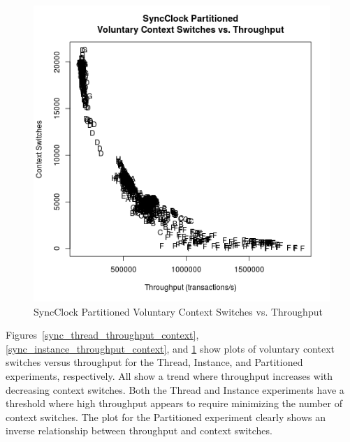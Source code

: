 \begin{figure}[H]
\center
\includegraphics[height=.4\textheight]{sync_partitioned_throughput_context.png}
\caption{SyncClock Partitioned Voluntary Context Switches vs. Throughput}
\label{sync_partitioned_throughput_context}
\end{figure}

Figures~\ref{sync_thread_throughput_context}, \ref{sync_instance_throughput_context}, and \ref{sync_partitioned_throughput_context} show plots of voluntary context switches versus throughput for the Thread, Instance, and Partitioned experiments, respectively.
All show a trend where throughput increases with decreasing context switches.
Both the Thread and Instance experiments have a threshold where high throughput appears to require minimizing the number of context switches.
The plot for the Partitioned experiment clearly shows an inverse relationship between throughput and context switches.

